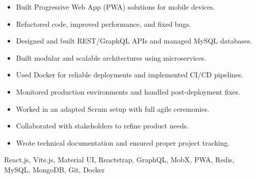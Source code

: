 \begin{experiences}
{\begin{itemize}
                \item Built Progressive Web App (PWA) solutions for mobile devices.
                \item Refactored code, improved performance, and fixed bugs.
                \item Designed and built REST/GraphQL APIs and managed MySQL databases.
                \item Built modular and scalable architectures using microservices.
                \item Used Docker for reliable deployments and implemented CI/CD pipelines.
                \item Monitored production environments and handled post-deployment fixes.
                \item Worked in an adapted Scrum setup with full agile ceremonies.
                \item Collaborated with stakeholders to refine product needs.
                \item Wrote technical documentation and ensured proper project tracking.\\
            \end{itemize}}
            {React.js, Vite.js, Material UI, Reactstrap, GraphQL, MobX, PWA, Redis, MySQL, MongoDB, Git, Docker}
    \emptySeparator
\end{experiences}
